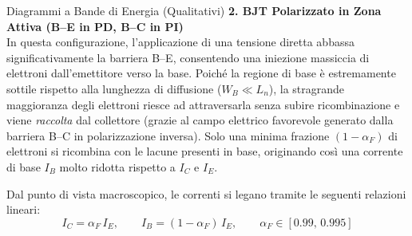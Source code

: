 \begin{osservazione}{Diagrammi a Bande di Energia (Qualitativi)}
    \textbf{2. BJT Polarizzato in Zona Attiva (B--E in PD, B--C in PI)} \\
    In questa configurazione, l'applicazione di una tensione diretta abbassa significativamente la barriera B--E, consentendo una iniezione massiccia di elettroni dall'emettitore verso la base. Poiché la regione di base è estremamente sottile rispetto alla lunghezza di diffusione ($W_B \ll L_n$), la stragrande maggioranza degli elettroni riesce ad attraversarla senza subire ricombinazione e viene \emph{raccolta} dal collettore (grazie al campo elettrico favorevole generato dalla barriera B--C in polarizzazione inversa). Solo una minima frazione $(1-\alpha_F)$ di elettroni si ricombina con le lacune presenti in base, originando così una corrente di base $I_B$ molto ridotta rispetto a $I_C$ e $I_E$.

    \vspace{0.3cm}
    \begin{center}
    \end{center}
    
    \vspace{0.2cm}
    Dal punto di vista macroscopico, le correnti si legano tramite le seguenti relazioni lineari:
    \[
        I_C = \alpha_F\,I_E,
        \qquad
        I_B = (1-\alpha_F)\,I_E,
        \qquad
        \alpha_F \in [0.99,\,0.995]
    \]
\end{osservazione}

